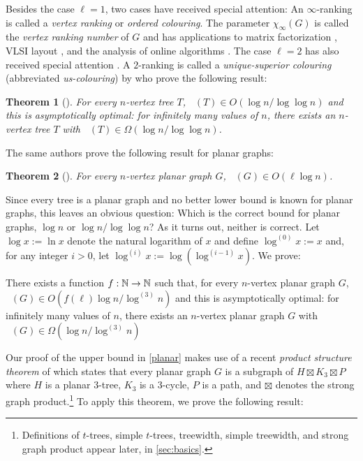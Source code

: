 \documentclass[kpfonts]{patmorin}
\DeclareMathOperator{\trn}{\chi_2}
\DeclareMathOperator{\lrn}{\chi_{\ell}}
\newtheorem{othertheorem}{Theorem}
\theoremstyle{named}
\begin{document}
Besides the case $\ell=1$, two cases have received special attention: An $\infty$-ranking is called a \emph{vertex ranking} or \emph{ordered colouring}. The parameter $\chi_\infty(G)$ is called the \emph{vertex ranking number} of $G$ and has applications to matrix factorization \cite{bodlaender.gilbert.ea:approximating,duff.reid:multifrontal,liu:role,dereniowski.kubale:cholesky}, VLSI layout \cite{leiserson:area,sen.deng.ea:on}, and the analysis of online algorithms \cite{even.smorodinsky:hitting}. The case $\ell=2$ has also received special attention \cite{almeter.demircan.ea:graph,karpas.neiman.ea:on,shalu.antony:complexity}. A $2$-ranking is called a \emph{unique-superior colouring} (abbreviated \emph{us-colouring}) by \citet{karpas.neiman.ea:on} who prove the following result:

\setcounter{othertheorem}{19}
\begin{othertheorem}[\cite{karpas.neiman.ea:on}]\label{trees}
    For every $n$-vertex tree $T$, $\trn(T)\in O(\log n/\log\log n)$ and this is asymptotically optimal: for infinitely many values of $n$, there exists an $n$-vertex tree $T$ with $\trn(T)\in\Omega(\log n/\log\log n)$.
\end{othertheorem}

The same authors prove the following result for planar graphs:

\setcounter{othertheorem}{15}
\begin{othertheorem}[\cite{karpas.neiman.ea:on}]\label{planar-graphs}
    For every $n$-vertex planar graph $G$, $\trn(G)\in O(\ell\log n)$.
\end{othertheorem}

Since every tree is a planar graph and no better lower bound is known for planar graphs, this leaves an obvious question:  Which is the correct bound for planar graphs, $\log n$ or $\log n/\log\log n$?  As it turns out, neither is correct.  Let $\log x :=\ln x$ denote the natural logarithm of $x$ and define $\log^{(0)}x:=x$ and, for any integer $i>0$, let $\log^{(i)}x:=\log(\log^{(i-1)} x)$. We prove:


\begin{thm}\label{planar}
    There exists a function $f:\mathbb{N}\to\mathbb{N}$ such that, for every $n$-vertex planar graph $G$, $\lrn(G)\in O(f(\ell)\log n/\log^{(3)} n)$ and this is asymptotically optimal: for infinitely many values of $n$, there exists an $n$-vertex planar graph $G$ with $\trn(G)\in \Omega(\log n/\log^{(3)} n)$
\end{thm}

Our proof of the upper bound in \cref{planar} makes use of a recent \emph{product structure theorem} of \citet{dujmovic.joret.ea:planar} which states that every planar graph $G$ is a subgraph of $H\boxtimes K_3\boxtimes P$ where $H$ is a planar $3$-tree, $K_3$ is a 3-cycle, $P$ is a path, and $\boxtimes$ denotes the strong graph product.\footnote{Definitions of $t$-trees, simple $t$-trees, treewidth, simple treewidth, and strong graph product appear later, in \cref{sec:basics}.}  To apply this theorem, we prove the following result:
\end{document}
